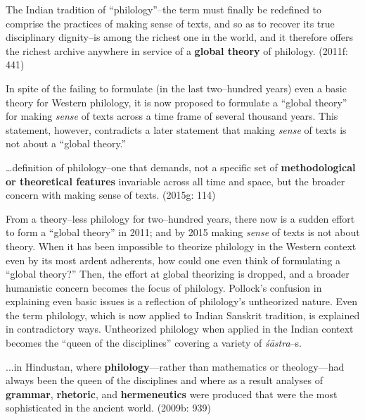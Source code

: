 \begin{myquote}
The Indian tradition of “philology”–the term must finally be redefined to comprise the practices of making sense of texts, and so as to recover its true disciplinary dignity–is among the richest one in the world, and it therefore offers the richest archive anywhere in service of a \textbf{global theory} of philology. (2011f: 441)
\end{myquote}

In spite of the failing to formulate (in the last two–hundred years) even a basic theory for Western philology, it is now proposed to formulate a “global theory” for making \textit{sense} of texts across a time frame of several thousand years. This statement, however, contradicts a later statement that making \textit{sense} of texts is not about a “global theory.”

\begin{myquote}
…definition of philology–one that demands, not a speciﬁc set of \textbf{methodological or theoretical features} invariable across all time and space, but the broader concern with making sense of texts. (2015g: 114)
\end{myquote}

\newpage

From a theory–less philology for two–hundred years, there now is a sudden effort to form a “global theory” in 2011; and by 2015 making \textit{sense} of texts is not about theory. When it has been impossible to theorize philology in the Western context even by its most ardent adherents, how could one even think of formulating a “global theory?” Then, the effort at global theorizing is dropped, and a broader humanistic concern becomes the focus of philology. Pollock’s confusion in explaining even basic issues is a reflection of philology’s untheorized nature. Even the term philology, which is now applied to Indian Sanskrit tradition, is explained in contradictory ways. Untheorized philology when applied in the Indian context becomes the “queen of the disciplines” covering a variety of \textit{śāstra}–s.

\begin{myquote}
...in Hindustan, where \textbf{philology}—rather than mathematics or theology—had always been the queen of the disciplines and where as a result analyses of \textbf{grammar}, \textbf{rhetoric}, and \textbf{hermeneutics} were produced that were the most sophisticated in the ancient world. (2009b: 939)
\end{myquote}

